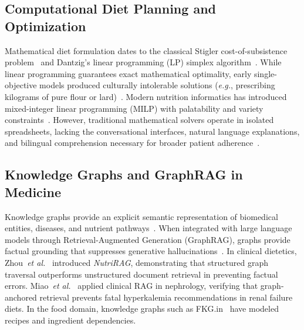 \documentclass[5p,times,twocolumn]{elsarticle}
\newcommand{\eg}{\textit{e.g.}}
\newcommand{\etal}{\textit{et al.}}
\begin{document}
\subsection{Computational Diet Planning and Optimization}
Mathematical diet formulation dates to the classical Stigler cost-of-subsistence problem~\cite{stigler1945cost} and Dantzig's linear programming (LP) simplex algorithm~\cite{dantzig1990diet}. While linear programming guarantees exact mathematical optimality, early single-objective models produced culturally intolerable solutions (\eg{}, prescribing kilograms of pure flour or lard)~\cite{stigler1945cost}. Modern nutrition informatics has introduced mixed-integer linear programming (MILP) with palatability and variety constraints~\cite{bondevik2024systematic, evwiekpaefe2023constraint}. However, traditional mathematical solvers operate in isolated spreadsheets, lacking the conversational interfaces, natural language explanations, and bilingual comprehension necessary for broader patient adherence~\cite{wang2025ai}.

\subsection{Knowledge Graphs and GraphRAG in Medicine}
Knowledge graphs provide an explicit semantic representation of biomedical entities, diseases, and nutrient pathways~\cite{pan2024roadmap}. When integrated with large language models through Retrieval-Augmented Generation (GraphRAG), graphs provide factual grounding that suppresses generative hallucinations~\cite{edge2024graphrag}. In clinical dietetics, Zhou~\etal{}~\cite{zhou2026nutrirag} introduced \textit{NutriRAG}, demonstrating that structured graph traversal outperforms unstructured document retrieval in preventing factual errors. Miao~\etal{}~\cite{miao2024clinical} applied clinical RAG in nephrology, verifying that graph-anchored retrieval prevents fatal hyperkalemia recommendations in renal failure diets. In the food domain, knowledge graphs such as FKG.in~\cite{gupta2024fkg} have modeled recipes and ingredient dependencies.
\end{document}
